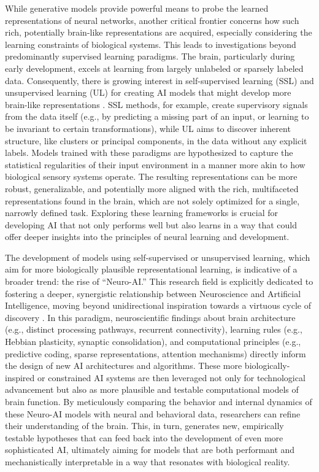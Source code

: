 While generative models provide powerful means to probe the learned representations of neural networks, another critical frontier concerns how such rich, potentially brain-like representations are acquired, especially considering the learning constraints of biological systems. This leads to investigations beyond predominantly supervised learning paradigms. The brain, particularly during early development, excels at learning from largely unlabeled or sparsely labeled data. Consequently, there is growing interest in self-supervised learning (SSL) and unsupervised learning (UL) for creating AI models that might develop more brain-like representations \cite{richards2019deep}. SSL methods, for example, create supervisory signals from the data itself (e.g., by predicting a missing part of an input, or learning to be invariant to certain transformations), while UL aims to discover inherent structure, like clusters or principal components, in the data without any explicit labels. Models trained with these paradigms are hypothesized to capture the statistical regularities of their input environment in a manner more akin to how biological sensory systems operate. The resulting representations can be more robust, generalizable, and potentially more aligned with the rich, multifaceted representations found in the brain, which are not solely optimized for a single, narrowly defined task. Exploring these learning frameworks is crucial for developing AI that not only performs well but also learns in a way that could offer deeper insights into the principles of neural learning and development.

The development of models using self-supervised or unsupervised learning, which aim for more biologically plausible representational learning, is indicative of a broader trend: the rise of ``Neuro-AI.'' This research field is explicitly dedicated to fostering a deeper, synergistic relationship between Neuroscience and Artificial Intelligence, moving beyond unidirectional inspiration towards a virtuous cycle of discovery \cite{richards2019deep, kriegeskorte2018cognitive}. In this paradigm, neuroscientific findings about brain architecture (e.g., distinct processing pathways, recurrent connectivity), learning rules (e.g., Hebbian plasticity, synaptic consolidation), and computational principles (e.g., predictive coding, sparse representations, attention mechanisms) directly inform the design of new AI architectures and algorithms. These more biologically-inspired or constrained AI systems are then leveraged not only for technological advancement but also as more plausible and testable computational models of brain function. By meticulously comparing the behavior and internal dynamics of these Neuro-AI models with neural and behavioral data, researchers can refine their understanding of the brain. This, in turn, generates new, empirically testable hypotheses that can feed back into the development of even more sophisticated AI, ultimately aiming for models that are both performant and mechanistically interpretable in a way that resonates with biological reality.

